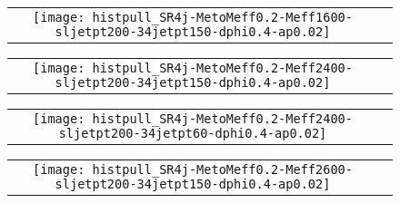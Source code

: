 \documentclass[landscape,12pt,a4paper]{article}
\begin{document}
\clearpage




\clearpage




\clearpage
\begin{figure}[H]\begin{center}\begin{tabular}{cc}\texttt{[image: histpull\_SR4j-MetoMeff0.2-Meff1600-sljetpt200-34jetpt150-dphi0.4-ap0.02]}\end{tabular}\end{center}\end{figure}
\begin{figure}[H]\begin{center}\begin{tabular}{cc}\texttt{[image: histpull\_SR4j-MetoMeff0.2-Meff2400-sljetpt200-34jetpt150-dphi0.4-ap0.02]}\end{tabular}\end{center}\end{figure}
\begin{figure}[H]\begin{center}\begin{tabular}{cc}\texttt{[image: histpull\_SR4j-MetoMeff0.2-Meff2400-sljetpt200-34jetpt60-dphi0.4-ap0.02]}\end{tabular}\end{center}\end{figure}
\begin{figure}[H]\begin{center}\begin{tabular}{cc}\texttt{[image: histpull\_SR4j-MetoMeff0.2-Meff2600-sljetpt200-34jetpt150-dphi0.4-ap0.02]}\end{tabular}\end{center}\end{figure}
\end{document}
